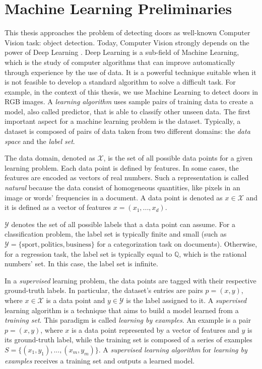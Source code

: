 \section{Machine Learning Preliminaries}
\label{sec:machine_learning}

This thesis approaches the problem of detecting doors as well-known Computer Vision task: object detection. Today, Computer Vision strongly depends on the power of Deep Learning \cite{deeplearningoverview}.
Deep Learning is a sub-field of Machine Learning, which is the study of computer algorithms that can improve automatically through experience by the use of data.  It is a powerful technique suitable when it is not feasible to develop a standard algorithm to solve a difficult task. For example, in the context of this thesis, we use Machine Learning to detect doors in RGB images. A \textit{learning algorithm} uses sample pairs of training data to create a model, also called predictor, that is able to classify other unseen data. The first important aspect for a machine learning problem is the dataset. Typically, a dataset is composed of pairs of data taken from two different domains: the \textit{data space} and the \textit{label set}.

\begin{definition}
	The data domain, denoted as $\mathcal{X}$, is the set of all possible data points for a given learning problem. Each data point is defined by features. In some cases, the features are encoded as vectors of real numbers. Such a representation is called \textit{natural} because the data consist of homogeneous quantities, like pixels in an image or words' frequencies in a document. A data point is denoted as $x \in \mathcal{X}$ and it is defined as a vector of features $x = (x_1, ..., x_d)$.
\end{definition}

\begin{definition}
	$\mathcal{Y}$ denotes the set of all possible labels that a data point can assume. For a classification problem, the label set is typically finite and small (such as $\mathcal{Y} = \{\text{sport}, \text{politics}, \text{business}\}$ for a categorization task on documents). Otherwise, for a regression task, the label set is typically equal to $\mathbb{Q}$, which is the rational numbers' set. In this case, the label set is infinite.
\end{definition}

In a \textit{supervised} learning problem, the data points are tagged with their respective ground-truth labels. In particular, the dataset's entries are pairs $p = (x, y)$, where $x \in \mathcal{X}$ is a data point and $y \in \mathcal{Y}$ is the label assigned to it. A \textit{supervised} learning algorithm is a technique that aims to build a model learned from a \textit{training set}. This paradigm is called \textit{learning by examples}. An example is a pair $p=(x, y)$, where $x$ is a data point represented by a vector of features and $y$ is its ground-truth label, while the training set is composed of a series of examples $S=\{(x_1, y_1), ..., (x_m, y_m)\}$. A \textit{supervised learning algorithm} for \textit{learning by examples} receives a training set and outputs a learned model.

